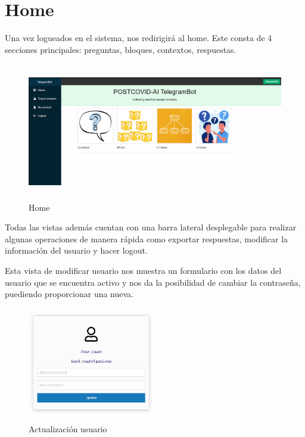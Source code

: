 \section{Home}

Una vez logueados en el sistema, nos redirigirá al home. Este consta de 4 secciones principales: preguntas, bloques, contextos, respuestas.\vspace{0.5cm}

\begin{figure}[!ht]
    \centering
    \includegraphics[width=1\textwidth, height=6cm]{imagenes/home.png}
    \caption{ Home }
    \label{fig:enter-label}
\end{figure}
\vspace{0.5cm}

Todas las vistas además cuentan con una barra lateral desplegable para realizar algunas operaciones de manera rápida como exportar respuestas, modificar la información del usuario y hacer logout. 

Esta vista de modificar usuario nos muestra un formulario con los datos del usuario que se encuentra activo y nos da la posibilidad de cambiar la contraseña, puediendo proporcionar una nueva.

\begin{figure}
    \centering
    \includegraphics[width=0.5\textwidth, height=5cm]{imagenes/user_update.png}
    \caption{ Actualización usuario }
    \label{fig:enter-label}
\end{figure}
\vspace{1cm}

